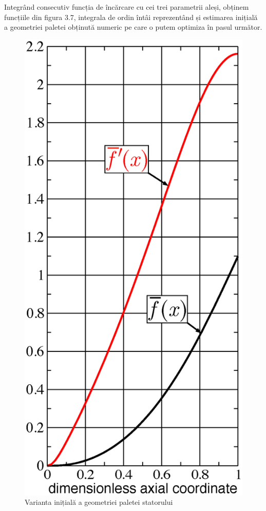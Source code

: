 Integrând consecutiv funcția de încărcare cu cei trei parametrii aleși, obținem funcțiile din figura 3.7, integrala de ordin întâi reprezentând și estimarea inițială a geometriei paletei obținută numeric pe care o putem optimiza în pasul următor.

\begin{figure}[t]
	\centering
	\includegraphics[scale=0.35]{figures/stator_initial_blade.eps}
	\caption{Varianta inițială a geometriei paletei statorului}
	\label{Varianta inițială a geometriei paletei statorului}
\end{figure}

